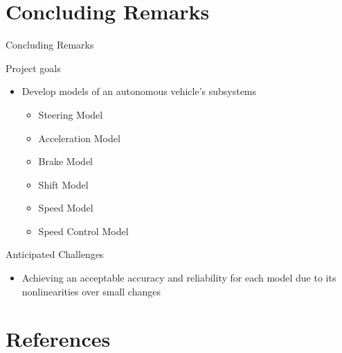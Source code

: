 \documentclass{beamer}
\begin{document}

\section{Concluding Remarks}
\begin{frame}{Concluding Remarks}
  \begin{block}{Project goals}
    \begin{LARGE}
      \begin{itemize}
        \item Develop models of an autonomous vehicle's subsystems
        \begin{itemize}
          \item Steering Model
          \item Acceleration Model
          \item Brake Model
          \item Shift Model
          \item Speed Model
          \item Speed Control Model
        \end{itemize}
      \end{itemize}
    \end{LARGE}
  \end{block}
  \begin{block}{Anticipated Challenges}
    \begin{itemize}
      \item Achieving an acceptable accuracy and reliability for each model due to its nonlinearities over small changes
    \end{itemize}
  \end{block}
\end{frame}


\section{References}
\end{document}
